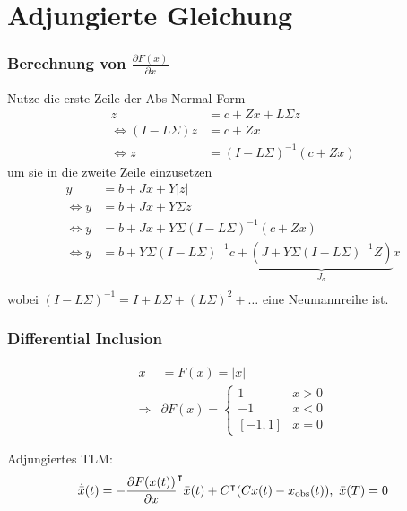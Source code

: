 \section[Adjungierte Gleichung]{Adjungierte Gleichung}

\begin{frame}[<+->]
\frametitle{Berechnung von $\frac{\partial F(x)}{\partial x}$}
Nutze die erste Zeile der Abs Normal Form
\begin{align*}
z &= c+Zx + L\Sigma z \\
\iff (I-L\Sigma)z &= c+Zx  \\
\iff z &= (I-L\Sigma)^{-1}(c+Zx) 
\end{align*}
\pause
um sie in die zweite Zeile einzusetzen
\begin{align*}
y &= b+ Jx + Y|z| \\
\iff y &= b+ Jx + Y\Sigma z \\
\iff y &= b+ Jx + Y\Sigma (I-L\Sigma)^{-1}(c+Zx) \\
\iff y &= b+  Y\Sigma (I-L\Sigma)^{-1}c + \underbrace{(J + Y\Sigma (I-L\Sigma)^{-1}Z)}_{J_\sigma} x \\
\end{align*}
\vspace*{1cm}
wobei $(I-L\Sigma)^{-1} = I +L\Sigma + (L\Sigma)^2+\ldots$ eine Neumannreihe ist.
\end{frame}

\begin{frame}[<+->]
\frametitle{Differential Inclusion}

  \begin{minipage}{0.4\textwidth} 
  \scalebox{0.65}{}
  \end{minipage}
  \hfill
  \begin{minipage}{0.59\textwidth}
   \[
   \begin{aligned}
    \dot x &= F(x) = |x| \\
    \Rightarrow & \partial F(x) = \begin{cases}
                               1 & x>0\\
                               -1 & x<0\\
                               [-1,1] & x=0
                              \end{cases}                             
    \end{aligned}
   \]
  \end{minipage}
   Adjungiertes TLM:
   \[
    \dot{ \bar{x}}(t) =  -\frac{\partial F(x(t))}{\partial x}^\intercal \bar x(t) +C^\intercal(Cx(t) - x_{\text{obs}}(t)), ~ \bar x(T) =0
   \]

  \end{frame}

